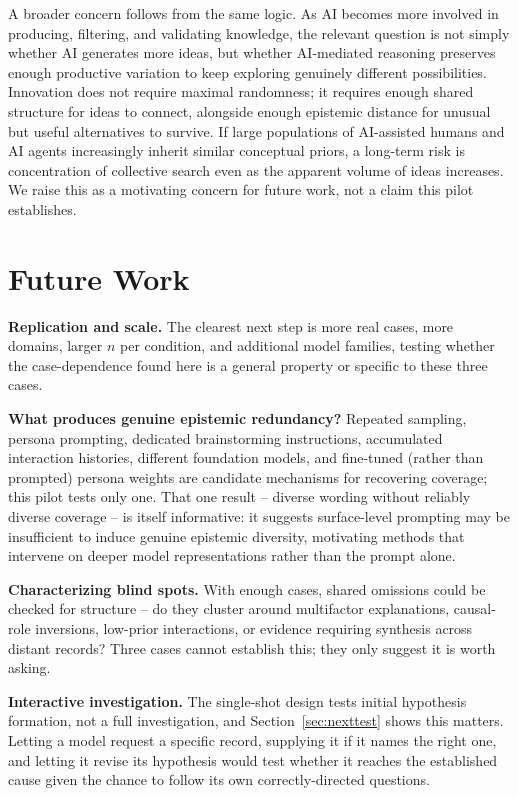 \documentclass[11pt]{article}
\begin{document}
A broader concern follows from the same logic. As AI becomes more involved
in producing, filtering, and validating knowledge, the relevant question
is not simply whether AI generates more ideas, but whether AI-mediated
reasoning preserves enough productive variation to keep exploring
genuinely different possibilities. Innovation does not require maximal
randomness; it requires enough shared structure for ideas to connect,
alongside enough epistemic distance for unusual but useful alternatives to
survive. If large populations of AI-assisted humans and AI agents
increasingly inherit similar conceptual priors, a long-term risk is
concentration of collective search even as the apparent volume of ideas
increases. We raise this as a motivating concern for future work, not a
claim this pilot establishes.

\section{Future Work}
\label{sec:future}

\textbf{Replication and scale.} The clearest next step is more real
cases, more domains, larger $n$ per condition, and additional model
families, testing whether the case-dependence found here is a general
property or specific to these three cases.

\textbf{What produces genuine epistemic redundancy?} Repeated sampling,
persona prompting, dedicated brainstorming instructions, accumulated
interaction histories, different foundation models, and fine-tuned
(rather than prompted) persona weights are candidate mechanisms for
recovering coverage; this pilot tests only one. That one result -- diverse
wording without reliably diverse coverage -- is itself informative: it
suggests surface-level prompting may be insufficient to induce genuine
epistemic diversity, motivating methods that intervene on deeper model
representations rather than the prompt alone.

\textbf{Characterizing blind spots.} With enough cases, shared omissions
could be checked for structure -- do they cluster around multifactor
explanations, causal-role inversions, low-prior interactions, or evidence
requiring synthesis across distant records? Three cases cannot establish
this; they only suggest it is worth asking.

\textbf{Interactive investigation.} The single-shot design tests initial
hypothesis formation, not a full investigation, and
Section~\ref{sec:nexttest} shows this matters. Letting a model request a
specific record, supplying it if it names the right one, and letting it
revise its hypothesis would test whether it reaches the established cause
given the chance to follow its own correctly-directed questions.
\end{document}
